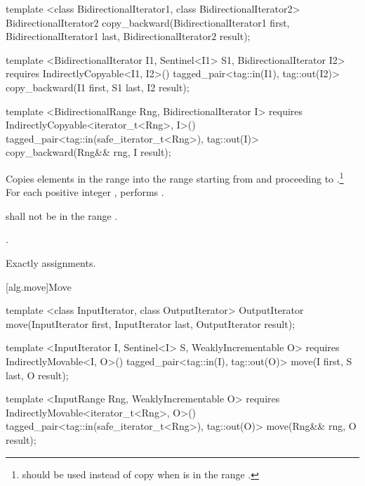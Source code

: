 %
\begin{removedblock}
\begin{itemdecl}
template <class BidirectionalIterator1, class BidirectionalIterator2>
  BidirectionalIterator2
    copy_backward(BidirectionalIterator1 first,
                  BidirectionalIterator1 last,
                  BidirectionalIterator2 result);
\end{itemdecl}
\end{removedblock}
\begin{addedblock}
\begin{itemdecl}
template <BidirectionalIterator I1, Sentinel<I1> S1, BidirectionalIterator I2>
  requires IndirectlyCopyable<I1, I2>()
  tagged_pair<tag::in(I1), tag::out(I2)>
    copy_backward(I1 first, S1 last, I2 result);

template <BidirectionalRange Rng, BidirectionalIterator I>
  requires IndirectlyCopyable<iterator_t<Rng>, I>()
  tagged_pair<tag::in(safe_iterator_t<Rng>), tag::out(I)>
    copy_backward(Rng&& rng, I result);
\end{itemdecl}
\end{addedblock}

\begin{itemdescr}
\pnum
\effects
Copies elements in the range 
into the
range 
starting from
and proceeding to .\footnote{
should be used instead of copy when 
is in
the range
.}
For each positive integer
,
performs
.

\pnum
\requires
{}
shall not be in the range
.

\pnum
\returns
{}.

\pnum
\complexity
Exactly
assignments.
\end{itemdescr}

[alg.move]{Move}

%
\begin{removedblock}
\begin{itemdecl}
template <class InputIterator, class OutputIterator>
  OutputIterator move(InputIterator first, InputIterator last,
                      OutputIterator result);
\end{itemdecl}
\end{removedblock}
\begin{addedblock}
\begin{itemdecl}
template <InputIterator I, Sentinel<I> S, WeaklyIncrementable O>
  requires IndirectlyMovable<I, O>()
  tagged_pair<tag::in(I), tag::out(O)>
    move(I first, S last, O result);

template <InputRange Rng, WeaklyIncrementable O>
  requires IndirectlyMovable<iterator_t<Rng>, O>()
  tagged_pair<tag::in(safe_iterator_t<Rng>), tag::out(O)>
    move(Rng&& rng, O result);
\end{itemdecl}
\end{addedblock}

